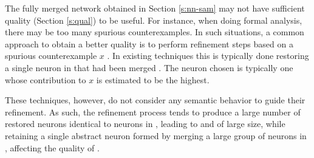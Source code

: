 The fully merged network obtained in Section \ref{s:nn-sam} may not have
sufficient quality (Section \ref{s:qual}) to be useful. For instance, when doing
formal analysis, there may be too many spurious counterexamples. In such
situations, a common approach to obtain a better quality \abs is to perform
refinement steps based on a spurious counterexample $x$ \cite{cegar-nn,
cegarette, cleverest-nn}.  In
existing techniques this is typically done restoring a single neuron in \cnc
that had been merged \abs. The neuron chosen is typically one whose contribution
to $x$ is estimated to be the highest.

These techniques, however, do not consider any semantic behavior to guide their
refinement. As such, the refinement process tends to produce a large number of
restored neurons identical to neurons in \cnc, leading to and \abs of large
size, while retaining a single abstract neuron formed by merging a large group
of neurons in \cnc, affecting the quality of \abs.  





